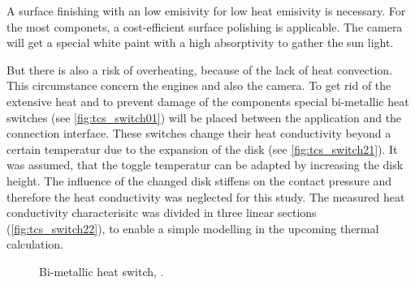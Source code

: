 A surface finishing with an low emisivity for low heat emisivity is necessary.
For the most componets, a cost-efficient surface polishing is applicable.
The camera will get a special white paint with a high absorptivity to gather the  sun light.

But there is also a risk of overheating, because of the lack of heat convection.
This circumstance concern the engines and also the camera.
To get rid of the extensive heat and to prevent damage of the components special bi-metallic heat switches (see \autoref{fig:tcs_switch01}) will be  placed between the application and the connection interface.
These switches change their heat conductivity beyond a certain temperatur due to the expansion of the disk (see \autoref{fig:tcs_switch21}).
It was assumed, that the toggle temperatur can be adapted by increasing the disk height.
The influence of the changed disk stiffens on the contact pressure and therefore the heat conductivity was neglected for this study.
The measured heat conductivity characterisitc was divided in three linear sections (\autoref{fig:tcs_switch22}), to enable a simple modelling in the upcoming thermal calculation.

\begin{figure}[h]
	\centering
	\qquad\qquad
	\caption{Bi-metallic heat switch, \cite{ref_tcs_04}.}
	\label{fig:tcs_switch01}
\end{figure}

